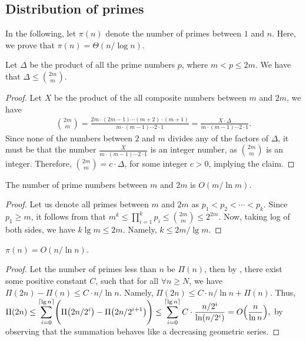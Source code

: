 \subsection{Distribution of primes}

In the following, let $\pi(n)$ denote the number of primes between $1$
and $n$. Here, we prove that $\pi(n) = \Theta( n / \log n)$.


\begin{lemma}
    Let $\Delta$ be the product of all the prime numbers $p$, where $m
    <p \leq 2m$. We have that $\Delta \leq \binom{2m}{m}$.
\end{lemma}

\begin{proof}
    Let $X$ be the product of the all composite numbers between $m$
    and $2m$, we have
    \begin{align*}
        \binom{2m}{m}%
        =%
        \frac{2m\cdot(2m - 1)\cdots(m + 2) \cdot(m + 1)}{m\cdot(m -
           1)\cdots{2}\cdot{1} }%
        =%
        \frac{X \cdot \Delta }{m\cdot(m - 1)\cdots{2} \cdot{1}}.
    \end{align*}
    Since none of the numbers between $2$ and $m$ divides any of the
    factors of $\Delta$, it must be that the number $\frac{X}{m\cdot(m
       - 1)\cdots{2}\cdot{1}}$ is an integer number, as
    $\binom{2m}{m}$ is an integer. Therefore, $\binom{2m}{m} =
    c\cdot \Delta$, for some integer $c > 0$, implying the claim.
\end{proof}


\begin{lemma}
    The number of prime numbers between $m$ and $2m$ is $O(m/\ln m)$.
\end{lemma}
\begin{proof}
    Let us denote all primes between $m$ and $2m$ as $p_1 < p_2 <
    \cdots< p_k$.  Since $p_1 \geq m$, it follows from
     that $m^k \le \prod_{i=1}^{k} {p_i} \le
    \binom{2m}{m}\leq 2^{2m}$.  Now, taking log of both sides, we
    have $k \lg{m} \leq 2m$. Namely, $k \leq 2m/\lg m$.
\end{proof}


\begin{lemma}
    $\pi(n) = O(n/\ln n)$.
\end{lemma}
\begin{proof}
    Let the number of primes less than $n$ be $\Pi(n)$, then by
    , there exist some positive constant
    $C$, such that for all $\forall n \ge N$, we have $\Pi(2n) -
    \Pi(n) \leq C\cdot n/\ln{n}$. Namely, $\Pi(2n) \leq C\cdot
    n/\ln{n}+ \Pi(n)$. Thus,
    \begin{math}\ds
        \Pi(2n)%
        \leq%
        \sum_{i=0}^{\ceil{\lg n} } \pth{ \Biggl. \Pi\pth{2n/2^i} -
           \Pi\pth{2n/2^{i+1}}}%
        \leq%
        \sum_{i=0}^{\ceil{\lg n} } C\cdot \frac{n/2^i}{\ln
           \pth{n/2^i}}%
        =%
        O\pth{\frac{n}{\ln{n}}},
    \end{math}
    by observing that the summation behaves like a decreasing
    geometric series.
\end{proof}


